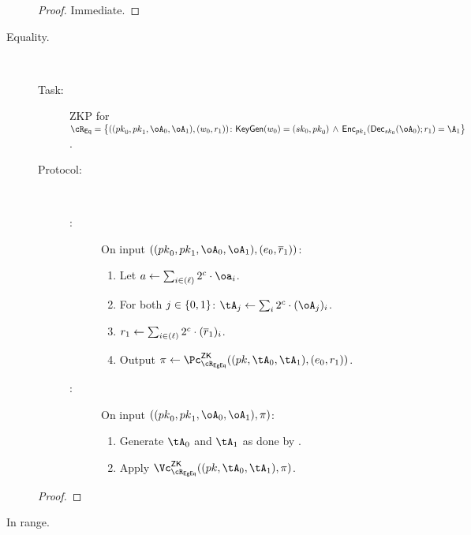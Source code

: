 \begin{description}
	\begin{proof}
		Immediate.
	\end{proof}
	
\item[Equality.]~ 

\begin{description}
	\item[Task:] ZKP for $\rEq =\rEqDef$.
	
	\item[Protocol:]~
	
	\begin{description}
		
	\item[\Pc:]  On input $((\pk_0,\pk_1,\oA_0,\oA_1),(e_0,\orr_1))$: 
	

	\begin{enumerate}
		
		\item Let  $a \asn  \sum_{i\in (\ell)}    2^c \cdot \oa_i$. 
		
		\item For both $j\in \zo$:  $\tA_j \asn  \sum_i  2^c \cdot (\oA_j)_i$. 
		
		  
		\item    $r_1 \leftarrow  \sum_{i\in (\ell)}  2^c \cdot (\overline{r}_1)_i$. 
			
		 
		\item Output $\pi \asn \pZK{\rEgEq}((\pk,\tA_0,\tA_1), (e_0,r_1))$.
				 
	\end{enumerate}
	
	\item[\Vc:] On input $((\pk_0,\pk_1,\oA_0,\oA_1),\pi)$: 
	
	\begin{enumerate}
		\item Generate $\tA_0$ and  $\tA_1$ as done by \Pc.
		
	\item Apply $\vZK{\rEgEq}((\pk,\tA_0,\tA_1), \pi)$.
	
	\end{enumerate}
\end{description}
	\end{description}
		

\begin{proof}
\end{proof}
  



\item[In range.]~  


\end{description}
